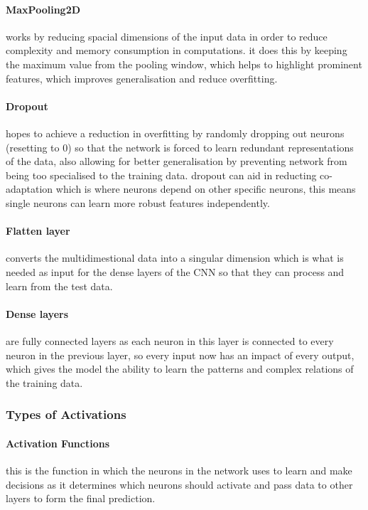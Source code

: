 \documentclass[]{final_report}
\begin{document}
\paragraph{MaxPooling2D} 
works by reducing spacial dimensions of the input data in order to reduce complexity and memory consumption in computations. it does this by keeping the maximum value from the pooling window, which helps to highlight prominent features, which improves generalisation and reduce overfitting.

\paragraph{Dropout} 
hopes to achieve a reduction in overfitting by randomly dropping out neurons (resetting to 0) so that the network is forced to learn redundant representations of the data, also allowing for better generalisation by preventing network from being too specialised to the training data. dropout can aid in reducting co-adaptation which is where neurons depend on other specific neurons, this means single neurons can learn more robust features independently. 

\paragraph{Flatten layer}
converts the multidimestional data into a singular dimension which is what is needed as input for the dense layers of the CNN so that they can process and learn from the test data.

\paragraph{Dense layers}
are fully connected layers as each neuron in this layer is connected to every neuron in the previous layer, so every input now has an impact of every output, which gives the model the ability to learn the patterns and complex relations of the training data.

\subsubsection{Types of Activations}

\paragraph{Activation Functions}
this is the function in which the neurons in the network uses to learn and make decisions as it determines which neurons should activate and pass data to other layers to form the final prediction.
\end{document}

